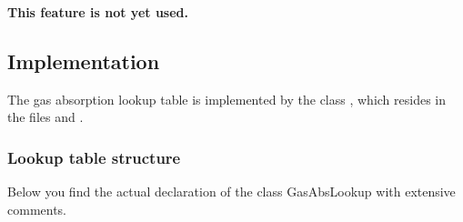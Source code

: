 \textbf{This feature is not yet used.}


\subsection{Implementation}
The gas absorption lookup table is implemented by the class
, which resides in the files
 and .

\subsubsection{Lookup table structure}

Below you find the actual declaration of the class GasAbsLookup with
extensive comments.

